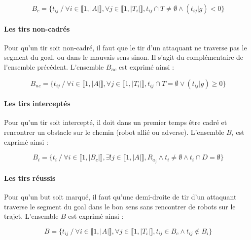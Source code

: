\documentclass[12pt]{article}
\begin{document}
\begin{equation*}
    B_c = \{ t_{ij} \ / \ \forall i \in \llbracket 1, |A| \rrbracket, \forall j \in \llbracket 1, |T_i| \rrbracket, t_{ij} \cap T \ne \emptyset \wedge (t_{ij}|g) < 0  \}
\end{equation*}


\paragraph{Les tirs non-cadrés}
Pour qu'un tir soit non-cadré, il faut que le tir d'un attaquant ne traverse pas le segment du goal, ou dans le mauvais sens sinon. Il s'agit du complémentaire de l'ensemble précédent. L'ensemble $B_{nc}$ est exprimé ainsi :

\begin{equation*}
    B_{nc} = \{ t_{ij} \ / \ \forall i \in \llbracket 1, |A| \rrbracket, \forall j \in \llbracket 1, |T_i| \rrbracket, t_{ij} \cap T = \emptyset \vee (t_{ij}|g) \geqslant 0 \}
\end{equation*}

\paragraph{Les tirs interceptés}
Pour qu'un tir soit intercepté, il doit dans un premier temps être cadré et rencontrer un obstacle sur le chemin (robot allié ou adverse). L'ensemble $B_i$ est exprimé ainsi :

\begin{equation*}
    B_i = \{  t_i \ / \ \forall i \in \llbracket 1, |B_c| \rrbracket, \exists ! j \in \llbracket 1, |A| \rrbracket, R_{a_j} \wedge t_i \ne \emptyset \wedge t_i \cap D = \emptyset \}
\end{equation*}



\paragraph{Les tirs réussis}
Pour qu'un but soit marqué, il faut qu'une demi-droite de tir d'un attaquant traverse le segment du goal dans le bon sens sans rencontrer de robots sur le trajet. L'ensemble $B$ est exprimé ainsi :

\begin{equation*}
    B = \{t_{ij} \ / \ \forall i \in \llbracket 1, |A| \rrbracket, \forall j \in \llbracket 1, |T_i| \rrbracket, t_{ij}  \in B_c \wedge t_{ij} \notin B_i  \}
\end{equation*}
\end{document}
